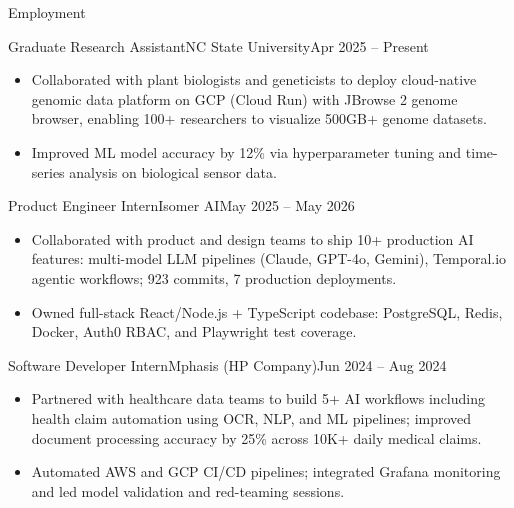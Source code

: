 \documentclass[]{mcdowellcv}
\begin{document}
\makeheader

\begin{cvsection}{Employment}
  \begin{cvsubsection}{Graduate Research Assistant}{NC State University}{Apr 2025 -- Present}
    \begin{itemize}
      \item Collaborated with plant biologists and geneticists to deploy cloud-native genomic data platform on GCP (Cloud Run) with JBrowse 2 genome browser, enabling 100+ researchers to visualize 500GB+ genome datasets.
      \item Improved ML model accuracy by 12\% via hyperparameter tuning and time-series analysis on biological sensor data.
    \end{itemize}
    \vspace{-1.5pt}
  \end{cvsubsection}

  \begin{cvsubsection}{Product Engineer Intern}{Isomer AI}{May 2025 -- May 2026}
    \begin{itemize}
      \item Collaborated with product and design teams to ship 10+ production AI features: multi-model LLM pipelines (Claude, GPT-4o, Gemini), Temporal.io agentic workflows; 923 commits, 7 production deployments.
      \item Owned full-stack React/Node.js + TypeScript codebase: PostgreSQL, Redis, Docker, Auth0 RBAC, and Playwright test coverage.
    \end{itemize}
    \vspace{-1.5pt}
  \end{cvsubsection}

  \begin{cvsubsection}{Software Developer Intern}{Mphasis (HP Company)}{Jun 2024 -- Aug 2024}
    \begin{itemize}
      \item Partnered with healthcare data teams to build 5+ AI workflows including health claim automation using OCR, NLP, and ML pipelines; improved document processing accuracy by 25\% across 10K+ daily medical claims.
      \item Automated AWS and GCP CI/CD pipelines; integrated Grafana monitoring and led model validation and red-teaming sessions.
    \end{itemize}
    \vspace{-1.5pt}
  \end{cvsubsection}


\end{cvsection}
\end{document}

